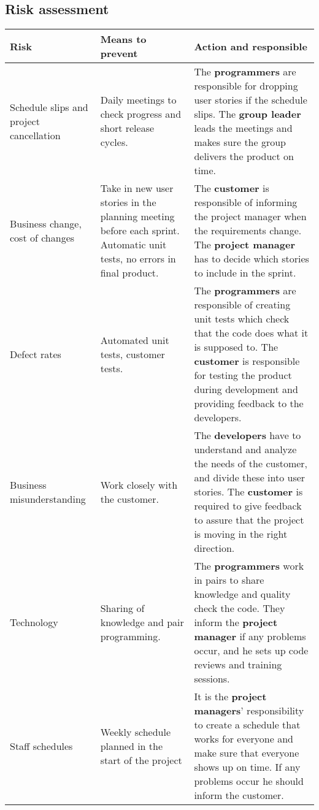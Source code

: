 \subsection{Risk assessment}
\begin{adjustbox}{center}
\begin{tabular}{ p{0.1\paperwidth} | p{0.25\paperwidth} | p{0.3\paperwidth} }
    Risk & Means to prevent & Action and responsible \\ \hline
    Schedule slips and project cancellation
    & Daily meetings to check progress and short release cycles.
    & The \textbf{programmers} are responsible for dropping user stories if the schedule slips. The \textbf{group leader} leads the meetings and makes sure the group delivers the product on time. \\ \hline
    Business change, cost of changes
    & Take in new user stories in the planning meeting before each sprint. Automatic unit tests, no errors in final product.
    & The \textbf{customer} is responsible of informing the project manager when the requirements change. The \textbf{project manager} has to decide which stories to include in the sprint. \\ \hline
    Defect rates
    & Automated unit tests, customer tests.
    & The \textbf{programmers} are responsible of creating unit tests which check that the code does what it is supposed to. The \textbf{customer} is responsible for testing the product during development and providing feedback to the developers. \\ \hline
    Business misunderstanding
    & Work closely with the customer.
    & The \textbf{developers} have to understand and analyze the needs of the customer, and divide these into user stories. The \textbf{customer} is required to give feedback to assure that the project is moving in the right direction. \\ \hline
    Technology
    & Sharing of knowledge and pair programming. 
    & The \textbf{programmers} work in pairs to share knowledge and quality check the code. They inform the \textbf{project manager} if any problems occur, and he sets up code reviews and training sessions. \\ \hline
    Staff schedules
    & Weekly schedule planned in the start of the project
    & It is the \textbf{project managers}' responsibility to create a schedule that works for everyone and make sure that everyone shows up on time. If any problems occur he should inform the customer. \\ \hline
    
    
    
\end{tabular}
\end{adjustbox}

